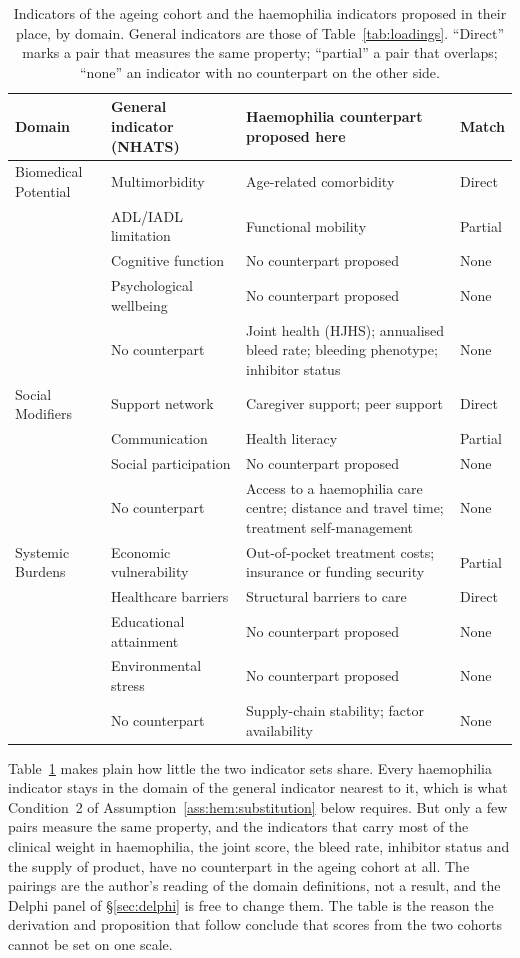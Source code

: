 \begin{table}[htbp]
\centering
\caption{Indicators of the ageing cohort and the haemophilia indicators proposed in their place, by domain. General indicators are those of Table~\ref{tab:loadings}. ``Direct'' marks a pair that measures the same property; ``partial'' a pair that overlaps; ``none'' an indicator with no counterpart on the other side.}
\label{tab:hemo-map}
\footnotesize
\renewcommand{\arraystretch}{1.2}
\begin{tabular}{p{2.3cm} p{3.4cm} p{4.6cm} p{1.6cm}}
\toprule
\textbf{Domain} & \textbf{General indicator (NHATS)} & \textbf{Haemophilia counterpart proposed here} & \textbf{Match} \\
\midrule
Biomedical Potential & Multimorbidity & Age-related comorbidity & Direct \\
 & ADL/IADL limitation & Functional mobility & Partial \\
 & Cognitive function & No counterpart proposed & None \\
 & Psychological wellbeing & No counterpart proposed & None \\
 & No counterpart & Joint health (HJHS); annualised bleed rate; bleeding phenotype; inhibitor status & None \\
\addlinespace
Social Modifiers & Support network & Caregiver support; peer support & Direct \\
 & Communication & Health literacy & Partial \\
 & Social participation & No counterpart proposed & None \\
 & No counterpart & Access to a haemophilia care centre; distance and travel time; treatment self-management & None \\
\addlinespace
Systemic Burdens & Economic vulnerability & Out-of-pocket treatment costs; insurance or funding security & Partial \\
 & Healthcare barriers & Structural barriers to care & Direct \\
 & Educational attainment & No counterpart proposed & None \\
 & Environmental stress & No counterpart proposed & None \\
 & No counterpart & Supply-chain stability; factor availability & None \\
\bottomrule
\end{tabular}
\end{table}

Table~\ref{tab:hemo-map} makes plain how little the two indicator sets share. Every haemophilia indicator stays in the domain of the general indicator nearest to it, which is what Condition~2 of Assumption~\ref{ass:hem:substitution} below requires. But only a few pairs measure the same property, and the indicators that carry most of the clinical weight in haemophilia, the joint score, the bleed rate, inhibitor status and the supply of product, have no counterpart in the ageing cohort at all. The pairings are the author's reading of the domain definitions, not a result, and the Delphi panel of \S\ref{sec:delphi} is free to change them. The table is the reason the derivation and proposition that follow conclude that scores from the two cohorts cannot be set on one scale.

